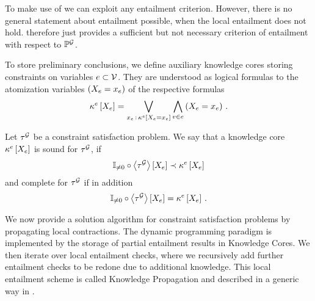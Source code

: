 \begin{remark}
    To make use of  we can exploit any entailment criterion.
    However, there is no general statement about entailment possible, when the local entailment does not hold.
     therefore just provides a sufficient but not necessary criterion of entailment with respect to $\mathbb{P}^{\mathcal{G}}$.
\end{remark}


To store preliminary conclusions, we define auxiliary knowledge cores storing constraints on variables $e\subset\mathcal{V}$.
They are understood as logical formulas to the atomization variables $\left(X_{e}=x_{e}\right)$ of the respective formulas
\begin{align*}
    \kappa^{e}\left[X_{e}\right]
    = \bigvee_{x_{e} \,:\, \kappa^{e}\left[X_{e}=x_{e}\right]} \bigwedge_{v\in e} \left(X_{e}=x_{e}\right) \, .
\end{align*}

\begin{definition}\label{def:knowledgeCoreSoundComplete}
    Let $\tau^{\mathcal{G}}$ be a constraint satisfaction problem. %
    We say that a knowledge core $\kappa^{e}\left[X_{e}\right]$ is sound for $\tau^{\mathcal{G}}$, if
    \begin{align*}
        \mathbb{I}_{\neq0}\circ\left\langle \tau^{\mathcal{G}}\right\rangle \left[ X_{e} \right]  \prec \kappa^{e}\left[X_{e}\right]
    \end{align*}
    and complete for $\tau^{\mathcal{G}}$ if in addition
    \begin{align*}
        \mathbb{I}_{\neq0}\circ\left\langle \tau^{\mathcal{G}}\right\rangle \left[ X_{e} \right]=\kappa^{e}\left[X_{e}\right] \, .
    \end{align*}
\end{definition}



We now provide a solution algorithm for constraint satisfaction problems by propagating local contractions.
The dynamic programming paradigm is implemented by the storage of partial entailment results in Knowledge Cores.
We then iterate over local entailment checks, where we recursively add further entailment checks to be redone due to additional knowledge.
This local entailment scheme is called Knowledge Propagation and described in a generic way in .

